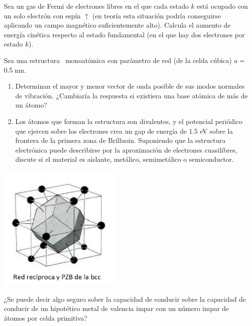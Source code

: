 \begin{ejercicio}
	Sea un gas de Fermi de electrones libres en el que cada estado $k$ está ocupado con un solo electrón con espín $\uparrow$ (en teoría esta situación podría conseguirse aplicando un campo magnético suficientemente alto). Calcula el aumento de energía cinética respecto al estado fundamental (en el que hay dos electrones por estado $k$).
\end{ejercicio}

\begin{ejercicio}
	Sea una estructura \bcc \ monoatómica con parámetro de red (de la celda cúbica) $a=$0.5 nm. 
	\begin{enumerate}[label=\alph*)]
		\item Determinan el mayor y menor vector de onda posible de sus modos normales de vibración. ¿Cambiaría la respuesta si existiera una base atómica de más de un átomo?
		\item Los átomos que forman la estructura son divalentes, y el potencial periódico que ejercen sobre los electrones crea un gap de energía de 1.5 eV sobre la frontera de la primera zona de Brilluoin. Suponiendo que la estructura electrónica puede describirse por la aproximación de electrones cuasilibres, discute si el material es aislante, metálico, semimetálico o semiconductor.
		
	\end{enumerate}
	
	\begin{center}
		\includegraphics[width=0.45\textwidth]{Imagenes/Enero_2021_03.png}
	\end{center}
	
\end{ejercicio}

\begin{ejercicio}
	¿Se puede decir algo seguro sober la capacidad de conducir sobre la capacidad de conducir de un hipotético metal de valencia impar con un número impar de átomos por celda primitiva?
\end{ejercicio}

